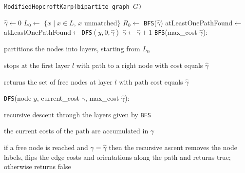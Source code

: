 \let\accentvec\vec \documentclass{llncs}
\newcommand{\cost}{\gamma}
\newcommand{\mcost}{\hat{\gamma}}
\begin{document}
\begin{algorithm}[!ht] 
\small
\caption{\texttt{ModifiedHopcroftKarp(\textsf{bipartite\_graph} $G$)}\label{algo:modHK}}



$\mcost \leftarrow 0$\;
{
$L_0\leftarrow$ $\{x \mid x\in L \text{, $x$ unmatched}\}$\;
$R_0\leftarrow$ \texttt{BFS}($\mcost$)\;
\textrm{atLeastOnePathFound}$\leftarrow$ \KwFalse\;
    {
        \textrm{atLeastOnePathFound}$\leftarrow $\texttt{DFS}$(y,0,\mcost)$\;
    }
    {
        $\mcost\leftarrow \mcost+1$\;
    }
}
\texttt{BFS}(\textsf{max\_cost} $\mcost$):
\begin{compactitem}
 \item partitions the nodes into layers, starting from $L_0$
 \item stops at the first layer $l$ with path to a right node with cost equals $\mcost$
 \item returns the set of free nodes at layer $l$ with path cost equals $\mcost$
\end{compactitem}
 
\texttt{DFS}(\textsf{node} $y$, \textsf{current\_cost} $\cost$, \textsf{max\_cost} $\mcost$):
\begin{compactitem}
 \item recursive descent through the layers given by \texttt{BFS}
 \item the current costs of the path are accumulated in $\cost$
 \item if a free node  is reached and $\cost=\mcost$ then the recursive ascent removes the node labels, flips the edge costs and orientations along the path and returns true; otherwise returns false
\end{compactitem}

\end{algorithm}
\end{document}
